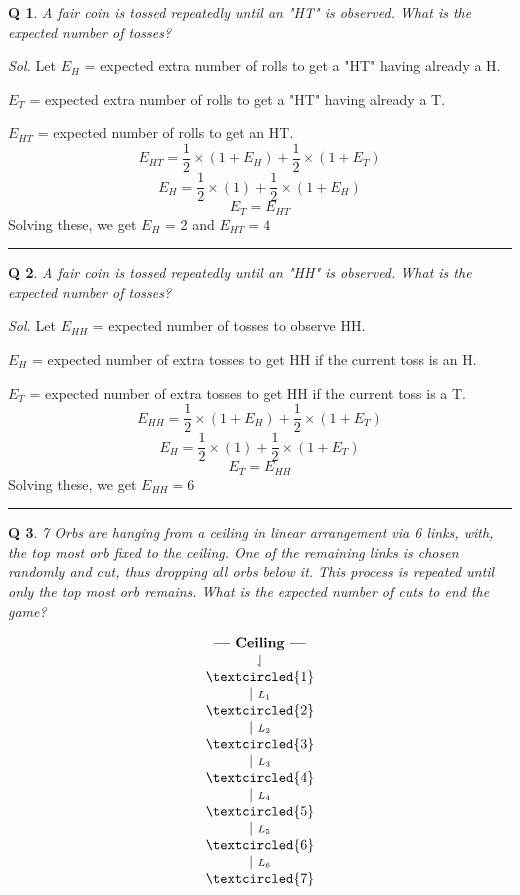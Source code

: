 \documentclass[DIV=15, fleqn, oneside, 8pt]{scrartcl}
\theoremstyle{clean}
\newtheorem{question}{Q} %
\newenvironment{solution}
{\par\textit{Sol.} }     %
{\par\medskip\hrule\bigskip}
\begin{document}
\begin{question}
A fair coin is tossed repeatedly until an "HT" is observed. What is the expected number of tosses?
\end{question}
\begin{solution}
Let $E_H$ = expected extra number of rolls to get a "HT" having already a H.

$E_T$ = expected extra number of rolls to get a "HT" having already a T.

$E_{HT}$ = expected number of rolls to get an HT.
\[E_{HT} = \frac{1}{2} \times (1 + E_{H}) + \frac{1}{2} \times (1 + E_{T})\]
\[E_H = \frac{1}{2} \times (1) + \frac{1}{2} \times (1 + E_H)\]
\[E_T = E_{HT}\]
Solving these, we get $E_H$ = 2 and $E_{HT} = 4$
\end{solution}
\begin{question}
A fair coin is tossed repeatedly until an "HH" is observed. What is the expected number of tosses?
\end{question}
\begin{solution}
Let $E_{HH}$ = expected number of tosses to observe HH.

$E_H$ = expected number of extra tosses to get HH if the current toss is an H.

$E_T$ = expected number of extra tosses to get HH if the current toss is a T.
\[E_{HH} = \frac{1}{2} \times (1 + E_H) + \frac{1}{2} \times (1 + E_T)\]
\[E_H = \frac{1}{2} \times (1) + \frac{1}{2} \times (1 + E_T)\]
\[E_T = E_{HH}\]
Solving these, we get $E_{HH} = 6$
\end{solution}
\begin{question}
7 Orbs are hanging from a ceiling in linear arrangement via 6 links, with, 
the top most orb fixed to the ceiling.
One of the remaining links is chosen randomly and cut, thus dropping all orbs below it.
This process is repeated until only the top most orb remains. 
What is the expected number of cuts to end the game?
\end{question}
$$
\begin{array}{c}
\textbf{--- Ceiling ---} \\
\downharpoonleft \\
\textcircled{1} \\
\mid \ \scriptstyle L_1 \\
\textcircled{2} \\
\mid \ \scriptstyle L_2 \\
\textcircled{3} \\
\mid \ \scriptstyle L_3 \\
\textcircled{4} \\
\mid \ \scriptstyle L_4 \\
\textcircled{5} \\
\mid \ \scriptstyle L_5 \\
\textcircled{6} \\
\mid \ \scriptstyle L_6 \\
\textcircled{7}
\end{array}
$$
\end{document}
